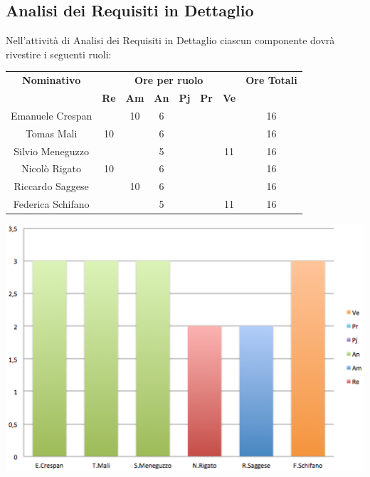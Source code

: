 \subsection{Analisi dei Requisiti in Dettaglio}
Nell’attività di Analisi dei Requisiti in Dettaglio ciascun componente dovrà rivestire i seguenti ruoli:
\begin{center}
  \centering
  \begin{tabular} {|c|c|c|c|c|c|c|c|}
    \hline
    \textbf{Nominativo} & \multicolumn{6}{|c|}{\textbf{Ore per ruolo}} & \textbf{Ore Totali} \\
    & \textbf{Re} & \textbf{Am} & \textbf{An} & \textbf{Pj} & \textbf{Pr} & \textbf{Ve} & \\
    \hline
    Emanuele Crespan & &10 &6 & & & &16 \\
    \hline
    Tomas Mali &10 & &6 & & & &16 \\
    \hline
    Silvio Meneguzzo & & &5 & & &11 &16\\
    \hline
    Nicolò Rigato &10 & &6 & & & &16\\
    \hline
    Riccardo Saggese & &10 &6 & & & &16\\
    \hline
    Federica Schifano & & &5 & & &11 &16\\
    \hline
  \end{tabular}
  \includegraphics[scale=0.65]{img/fig2.png}
\end{center}

